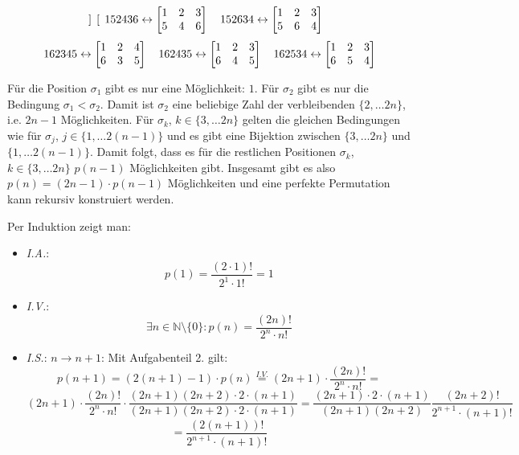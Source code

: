\begin{flushenum}
\[\begin{bmatrix}
		\end{bmatrix} \quad
		152436 \leftrightarrow
		\begin{bmatrix}
			1 & 2 & 3 \\
			5 & 4 & 6 \\
		\end{bmatrix} \quad
		152634 \leftrightarrow
		\begin{bmatrix}
			1 & 2 & 3 \\
			5 & 6 & 4 \\
		\end{bmatrix}
	\]
	\[
		162345 \leftrightarrow
		\begin{bmatrix}
			1 & 2 & 4 \\
			6 & 3 & 5 \\
		\end{bmatrix} \quad
		162435 \leftrightarrow
		\begin{bmatrix}
			1 & 2 & 3 \\
			6 & 4 & 5 \\
		\end{bmatrix} \quad
		162534 \leftrightarrow
		\begin{bmatrix}
			1 & 2 & 3 \\
			6 & 5 & 4 \\
		\end{bmatrix}
	\]

\item
	Für die Position $\sigma_1$ gibt es nur eine Möglichkeit: $1$. Für $\sigma_2$ gibt es nur die Bedingung $\sigma_1 < \sigma_2$.
	Damit ist $\sigma_2$ eine beliebige Zahl der verbleibenden $\{2, \ldots 2n\}$, i.e. $2n-1$ Möglichkeiten.
	Für $\sigma_k$, $k \in \{3, \ldots 2n\}$ gelten die gleichen Bedingungen wie für $\sigma_j$, $j \in \{1, \ldots 2(n-1)\}$ und es gibt eine
	Bijektion zwischen $\{3, \ldots 2n\}$ und $\{1, \ldots 2(n-1)\}$. Damit folgt, dass es für die restlichen Positionen $\sigma_k$, $k \in \{3, \ldots 2n\}$
	$p(n-1)$ Möglichkeiten gibt. Insgesamt gibt es also $p(n) = (2n - 1)\cdot p(n-1)$ Möglichkeiten und eine perfekte Permutation kann rekursiv konstruiert werden.

\item
	Per Induktion zeigt man:
	\begin{itemize}
		\item \textit{I.A.}: \[ p(1) = \frac{(2 \cdot 1)!}{2^1 \cdot 1!} = 1 \]
		\item \textit{I.V.}: \[ \exists n \in \mathbb{N}\setminus\{0\}: p(n) = \frac{(2n)!}{2^n \cdot n!} \]
		\item \textit{I.S.}: $ n \rightarrow n+1$: Mit Aufgabenteil 2. gilt:
			\[ p(n+1) = (2 (n+1) - 1) \cdot p(n) \overset{I.V.}{=} (2n + 1) \cdot \frac{(2n)!}{2^n \cdot n!} = \]
			\[ (2n + 1) \cdot \frac{(2n)!}{2^n \cdot n!} \cdot \frac{(2n + 1)(2n + 2)\cdot 2 \cdot (n+1)}{(2n+1)(2n + 2) \cdot2 \cdot (n+1)} = 
			   \frac{(2n+1) \cdot 2 \cdot (n+1)}{(2n + 1) (2n +2)}\frac{(2n+2)!}{2^{n+1} \cdot (n+1)!} \]
			\[ = \frac{(2(n+1))!}{2^{n+1}\cdot (n+1)!} \]
	\end{itemize}


\end{flushenum}
